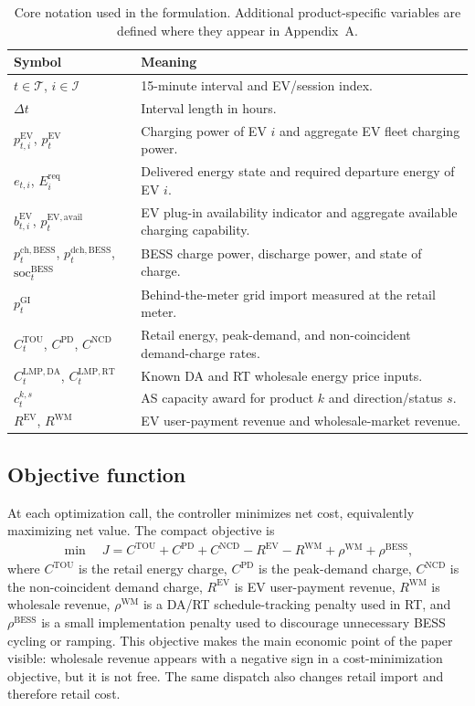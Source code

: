 \documentclass[final,5p,times]{elsarticle}
\newcommand{\DeltaT}{\Delta t}
\newcommand{\EV}{\mathrm{EV}}
\newcommand{\BESS}{\mathrm{BESS}}
\newcommand{\DA}{\mathrm{DA}}
\newcommand{\RT}{\mathrm{RT}}
\newcommand{\GI}{\mathrm{GI}}
\newcommand{\TOU}{\mathrm{TOU}}
\newcommand{\PD}{\mathrm{PD}}
\newcommand{\NCD}{\mathrm{NCD}}
\newcommand{\soc}{\mathrm{soc}}
\newcommand{\WM}{\mathrm{WM}}
\newcommand{\LMP}{\mathrm{LMP}}
\newcommand{\ch}{\mathrm{ch}}
\newcommand{\dch}{\mathrm{dch}}
\newcommand{\req}{\mathrm{req}}
\newcommand{\avail}{\mathrm{avail}}
\newcommand{\calT}{\mathcal{T}}
\newcommand{\calI}{\mathcal{I}}
\begin{document}
\begin{table}[!t]
\centering
\caption{Core notation used in the formulation. Additional product-specific variables are defined where they appear in Appendix~A.}
\label{tab:notation_core}
\scriptsize
\begin{tabularx}{\textwidth}{@{}p{}p{}@{}}
\toprule
Symbol & Meaning \\
\midrule
$t\in\calT$, $i\in\calI$ & 15-minute interval and EV/session index.\\
$\DeltaT$ & Interval length in hours.\\
$p_{t,i}^{\EV}$, $p_t^{\EV}$ & Charging power of EV $i$ and aggregate EV fleet charging power.\\
$e_{t,i}$, $E_i^{\req}$ & Delivered energy state and required departure energy of EV $i$.\\
$b_{t,i}^{\EV}$, $p_t^{\EV,\avail}$ & EV plug-in availability indicator and aggregate available charging capability.\\
$p_t^{\ch,\BESS}$, $p_t^{\dch,\BESS}$, $\soc_t^{\BESS}$ & BESS charge power, discharge power, and state of charge.\\
$p_t^{\GI}$ & Behind-the-meter grid import measured at the retail meter.\\
$C_t^{\TOU}$, $C^{\PD}$, $C^{\NCD}$ & Retail energy, peak-demand, and non-coincident demand-charge rates.\\
$C_t^{\LMP,\DA}$, $C_t^{\LMP,\RT}$ & Known DA and RT wholesale energy price inputs.\\
$c_t^{k,s}$ & AS capacity award for product $k$ and direction/status $s$.\\
$R^{\EV}$, $R^{\WM}$ & EV user-payment revenue and wholesale-market revenue.\\
\bottomrule
\end{tabularx}
\end{table}

\subsection{Objective function}
At each optimization call, the controller minimizes net cost, equivalently maximizing net value. The compact objective is
\begin{align}
\min \quad
J = C^{\TOU}+C^{\PD}+C^{\NCD}-R^{\EV}-R^{\WM}+\rho^{\WM}+\rho^{\BESS},
\label{eq:objective_main}
\end{align}
where $C^{\TOU}$ is the retail energy charge, $C^{\PD}$ is the peak-demand charge, $C^{\NCD}$ is the non-coincident demand charge, $R^{\EV}$ is EV user-payment revenue, $R^{\WM}$ is wholesale revenue, $\rho^{\WM}$ is a DA/RT schedule-tracking penalty used in RT, and $\rho^{\BESS}$ is a small implementation penalty used to discourage unnecessary BESS cycling or ramping. This objective makes the main economic point of the paper visible: wholesale revenue appears with a negative sign in a cost-minimization objective, but it is not free. The same dispatch also changes retail import and therefore retail cost.
\end{document}
